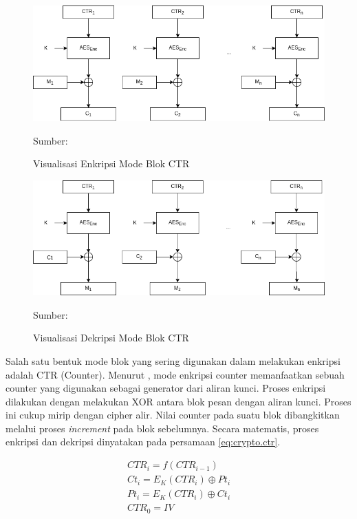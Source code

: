 \begin{figure}[!h]
  \centering
  \includegraphics[width=\textwidth]{chapters/res/chapter-2/img/ctr.enc.png}
  \caption{Visualisasi Enkripsi Mode Blok CTR} 
  \label{fig:crypto.ctr.encrypt}
  Sumber: \textcite{munir2019}
\end{figure}

\begin{figure}[!h]
  \centering
  \includegraphics[width=\textwidth]{chapters/res/chapter-2/img/ctr.dec.png}
  \caption{Visualisasi Dekripsi Mode Blok CTR} 
  \label{fig:crypto.ctr.decrypt}
  Sumber: \textcite{munir2019}
\end{figure}

Salah satu bentuk mode blok yang sering digunakan dalam melakukan enkripsi adalah CTR (Counter). Menurut \textcite{munir2019}, mode enkripsi counter memanfaatkan sebuah counter yang digunakan sebagai generator dari aliran kunci. Proses enkripsi dilakukan dengan melakukan XOR antara blok pesan dengan aliran kunci. Proses ini cukup mirip dengan cipher alir. Nilai counter pada suatu blok dibangkitkan melalui proses \emph{increment} pada blok sebelumnya. Secara matematis, proses enkripsi dan dekripsi dinyatakan pada persamaan \ref{eq:crypto.ctr}.

\begin{equation}
  \label{eq:crypto.ctr}
  \begin{array}{l}
    CTR_i = f(CTR_{i-1}) \\   
    Ct_i = E_K(CTR_i) \oplus Pt_i \\
    Pt_i = E_K(CTR_i) \oplus Ct_i \\
    CTR_0 = IV
  \end{array}
\end{equation}

